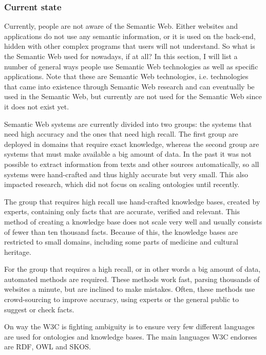 \documentclass{article}
\begin{document}
 \subsubsection{Current state} %
 Currently, people are not aware of the Semantic Web. Either websites and applications do not use any semantic information, or it is used on the back-end, hidden with other complex programs that users will not understand. So what is the Semantic Web used for nowadays, if at all? In this section, I will list a number of general ways people use Semantic Web technologies as well as specific applications. Note that these are Semantic Web technologies, i.e. technologies that came into existence through Semantic Web research and can eventually be used in the Semantic Web, but currently are not used for the Semantic Web since it does not exist yet.
 
 Semantic Web systems are currently divided into two groups: the systems that need high accuracy and the ones that need high recall. The first group are deployed in domains that require exact knowledge, whereas the second group are systems that must make available a big amount of data. In the past it was not possible to extract information from texts and other sources automatically, so all systems were hand-crafted and thus highly accurate but very small. This also impacted research, which did not focus on scaling ontologies until recently.
 
 The group that requires high recall use hand-crafted knowledge bases, created by experts, containing only facts that are accurate, verified and relevant. This method of creating a knowledge base does not scale very well and usually consists of fewer than ten thousand facts. Because of this, the knowledge bases are restricted to small domains, including some parts of medicine and cultural heritage\cite{byrne, le2002}.
 
 For the group that requires a high recall, or in other words a big amount of data, automated methods are required. These methods work fast, parsing thousands of websites a minute, but are inclined to make mistakes. Often, these methods use crowd-sourcing to improve accuracy, using experts or the general public to suggest or check facts\cite{zhou2007}.
 
 On way the W3C is fighting ambiguity is to ensure very few different languages are used for ontologies and knowledge bases. The main languages W3C endorses are RDF, OWL and SKOS\cite{rdf, owl, skos}. 
 
\end{document}
